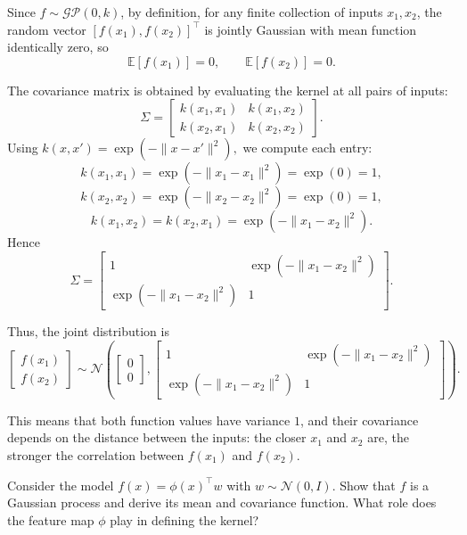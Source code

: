 \begin{solution}
    Since \(f \sim \mathcal{GP}(0,k)\), by definition, for any finite collection of inputs \(x_1,x_2\), the random vector $ [f(x_1),f(x_2)]^\top $ is jointly Gaussian with mean function identically zero, so
\[
\mathbb{E}[f(x_1)] = 0,
\qquad
\mathbb{E}[f(x_2)] = 0.
\]

The covariance matrix is obtained by evaluating the kernel at all pairs of inputs:
\[
\Sigma =
\begin{bmatrix}
k(x_1,x_1) & k(x_1,x_2)\\
k(x_2,x_1) & k(x_2,x_2)
\end{bmatrix}.
\]
Using
\(
k(x,x') = \exp(-\|x-x'\|^2),
\)
we compute each entry:
\[
k(x_1,x_1) = \exp(-\|x_1-x_1\|^2) = \exp(0)=1,
\]
\[
k(x_2,x_2) = \exp(-\|x_2-x_2\|^2) = \exp(0)=1,
\]
\[
k(x_1,x_2) = k(x_2,x_1) = \exp(-\|x_1-x_2\|^2).
\]
Hence
\[
\Sigma =
\begin{bmatrix}
1 & \exp(-\|x_1-x_2\|^2)\\
\exp(-\|x_1-x_2\|^2) & 1
\end{bmatrix}.
\]

Thus, the joint distribution is
\[
\begin{bmatrix}
f(x_1)\\
f(x_2)
\end{bmatrix}
\sim
\mathcal{N}\left(
\begin{bmatrix}
0\\
0
\end{bmatrix},
\begin{bmatrix}
1 & \exp(-\|x_1-x_2\|^2)\\
\exp(-\|x_1-x_2\|^2) & 1
\end{bmatrix}
\right).
\]

This means that both function values have variance \(1\), and their covariance depends on the distance between the inputs: the closer \(x_1\) and \(x_2\) are, the stronger the correlation between \(f(x_1)\) and \(f(x_2)\). 
\end{solution}

\begin{exercise}
    Consider the model \(f(x) = \phi(x)^\top w\) with \(w \sim \mathcal{N}(0, I)\).
    Show that \(f\) is a Gaussian process and derive its mean and covariance function.
    What role does the feature map \(\phi\) play in defining the kernel?
\end{exercise}

